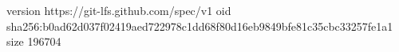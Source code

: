 version https://git-lfs.github.com/spec/v1
oid sha256:b0ad62d037f02419aed722978c1dd68f80d16eb9849bfe81c35cbc33257fe1a1
size 196704
